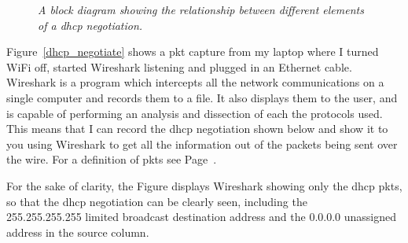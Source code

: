\documentclass[titlepage]{article}
\begin{document}
\begin{figure}[H]

  \begin{framed}

  \centering

  \end{framed}

  \caption{\textit{%
    A block diagram showing the relationship between
    different elements of a \gls{dhcp} negotiation.
  }}\label{dhcpdiagram}
\end{figure}

Figure~\ref{dhcp_negotiate} shows a \gls{pkt} capture from my laptop where I turned WiFi off, 
started Wireshark listening and plugged in an Ethernet cable. 
Wireshark is a program which intercepts all the network communications
on a single computer and records them to a file\cite{download:wireshark}.
It also displays them to the user, and is capable of performing an analysis and
dissection of each the protocols used.
This means that I can record the \gls{dhcp} negotiation shown below and 
show it to you using Wireshark to get all the information out of the packets
being sent over the wire.
For a definition of \glspl{pkt} see Page~\pageref{packetdef}.

For the sake of clarity, the Figure displays Wireshark showing only the \gls{dhcp} \glspl{pkt},
so that the \gls{dhcp} negotiation can be clearly seen, including the \\
255.255.255.255 limited broadcast destination address
and the 0.0.0.0 unassigned address in the source column\cite{wiki:ipaddresses}.
\end{document}

